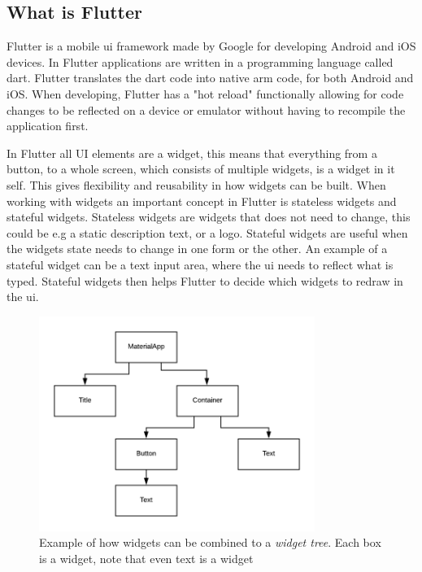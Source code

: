 \subsection{What is Flutter}


Flutter is a mobile \gls{ui} framework made by Google for developing Android and iOS devices\cite{flutterFAQ}. In Flutter applications  are written in a programming language called dart. Flutter translates the dart code into native arm code, for both Android and iOS.
When developing, Flutter has a "hot reload" functionally allowing for code changes to be reflected on a device or emulator without having to recompile the application first.

In Flutter all UI elements are a widget, this means that everything from a  button, to a  whole screen, which consists of multiple widgets, is a widget in it self. This gives flexibility and reusability in how widgets can be built. When working with widgets an important concept in Flutter is stateless widgets and stateful widgets. Stateless widgets are widgets that does not need to change, this could be  e.g a static description text, or a logo. Stateful widgets are useful when the widgets state needs to change in one form or the other.  An example of a stateful widget can be a text input area, where the \gls{ui} needs to reflect what is typed. Stateful widgets then helps Flutter to decide which widgets to redraw in the \gls{ui}.

\begin{figure}[h]
    \centering
    \includegraphics[width=0.8\textwidth]{figures/WidgetTree.png}
    \caption{Example of how widgets can be combined to a \textit{widget tree}. Each box is a widget, note that even text is a widget}
    \label{fig:WidgetTree}
\end{figure}

